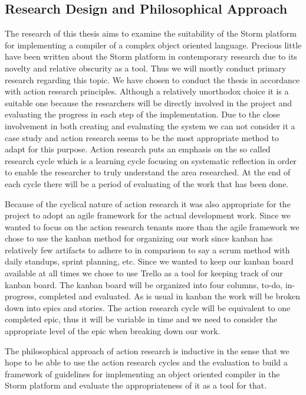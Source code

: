 \documentclass{sigchi}
\begin{document}
\subsection{Research Design and Philosophical Approach}
The research of this thesis aims to examine the suitability of the Storm platform for implementing a compiler of a complex object oriented language. Precious little have been written about the Storm platform in contemporary research due to its novelty and relative obscurity as a tool. Thus we will mostly conduct primary research regarding this topic. We have chosen to conduct the thesis in accordance with action research principles. Although a relatively unorthodox choice it is a suitable one because the researchers will be directly involved in the project and evaluating the progress in each step of the implementation. Due to the close involvement in both creating and evaluating the system we can not consider it a case study and action research seems to be the most appropriate method to adapt for this purpose. Action research puts an emphasis on the so called research cycle which is a learning cycle focusing on systematic reflection in order to enable the researcher to truly understand the area researched. At the end of each cycle there will be a period of evaluating of the work that has been done.

Because of the cyclical nature of action research it was also appropriate for the project to adopt an agile framework for the actual development work. Since we wanted to focus on the action research tenants more than the agile framework we chose to use the kanban method for organizing our work since kanban has relatively few artifacts to adhere to in comparison to say a scrum method with daily standups, sprint planning, etc. Since we wanted to keep our kanban board available at all times we chose to use Trello as a tool for keeping track of our kanban board. The kanban board will be organized into four columns, to-do, in-progress, completed and evaluated. As is usual in kanban the work will be broken down into epics and stories. The action research cycle will be equivalent to one completed epic, thus it will be variable in time and we need to consider the appropriate level of the epic when breaking down our work.

The philosophical approach of action research is inductive in the sense that we hope to be able to use the action research cycles and the evaluation to build a framework of guidelines for implementing an object oriented compiler in the Storm platform and evaluate the appropriateness of it as a tool for that.
\end{document}
